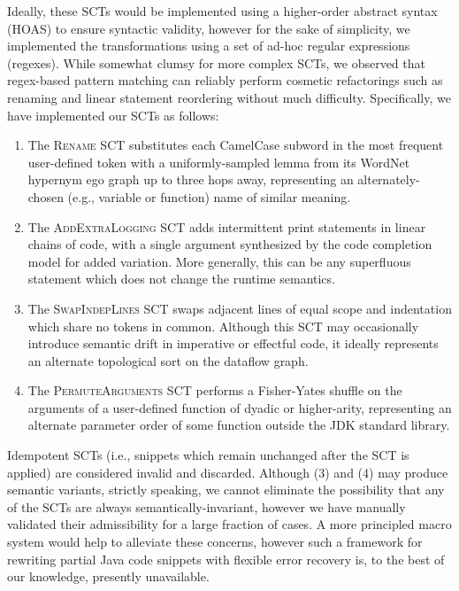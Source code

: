 \documentclass[usenames,dvipsnames]{article} %
\begin{document}
  Ideally, these SCTs would be implemented using a higher-order abstract syntax (HOAS) to ensure syntactic validity, however for the sake of simplicity, we implemented the transformations using a set of ad-hoc regular expressions (regexes). While somewhat clumsy for more complex SCTs, we observed that regex-based pattern matching can reliably perform cosmetic refactorings such as renaming and linear statement reordering without much difficulty. Specifically, we have implemented our SCTs as follows:

  \begin{enumerate}[itemsep=1ex]
    \item The \textsc{Rename} SCT substitutes each CamelCase subword in the most frequent user-defined token with a uniformly-sampled lemma from its WordNet hypernym ego graph up to three hops away, representing an alternately-chosen (e.g., variable or function) name of similar meaning.
    \item The \textsc{AddExtraLogging} SCT adds intermittent print statements in linear chains of code, with a single argument synthesized by the code completion model for added variation. More generally, this can be any superfluous statement which does not change the runtime semantics.
    \item The \textsc{SwapIndepLines} SCT swaps adjacent lines of equal scope and indentation which share no tokens in common. Although this SCT may occasionally introduce semantic drift in imperative or effectful code, it ideally represents an alternate topological sort on the dataflow graph.
    \item The \textsc{PermuteArguments} SCT performs a Fisher-Yates shuffle on the arguments of a user-defined function of dyadic or higher-arity, representing an alternate parameter order of some function outside the JDK standard library.
  \end{enumerate}

Idempotent SCTs (i.e., snippets which remain unchanged after the SCT is applied) are considered invalid and discarded. Although (3) and (4) may produce semantic variants, strictly speaking, we cannot eliminate the possibility that any of the SCTs are always semantically-invariant, however we have manually validated their admissibility for a large fraction of cases. A more principled macro system would help to alleviate these concerns, however such a framework for rewriting partial Java code snippets with flexible error recovery is, to the best of our knowledge, presently unavailable.
\end{document}
